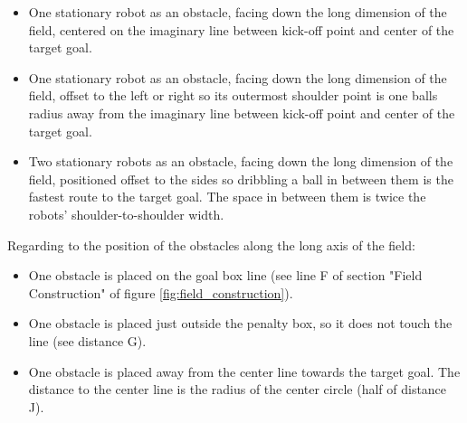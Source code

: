 \begin{itemize}
	\item One stationary robot as an obstacle, facing down the long dimension of the field, centered on the imaginary line between kick-off point and center of the target goal.
	\item One stationary robot as an obstacle, facing down the long dimension of the field, offset to the left or right so its outermost shoulder point is one balls radius away from the imaginary line between kick-off point and center of the target goal. %
	\item Two stationary robots as an obstacle, facing down the long dimension of the field, positioned offset to the sides so dribbling a ball in between them is the fastest route to the target goal. The space in between them is twice the robots' shoulder-to-shoulder width. %
\end{itemize}

Regarding to the position of the obstacles along the long axis of the field:

\begin{itemize}
	\item One obstacle is placed on the goal box line (see line F of section "Field Construction" of figure \ref{fig:field_construction}).
	\item One obstacle is placed just outside the penalty box, so it does not touch the line (see distance  G).
	\item One obstacle is placed away from the center line towards the target goal. The distance to the center line is the radius of the center circle (half of distance J).
\end{itemize}

